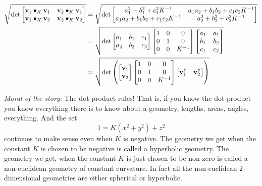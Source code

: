 \documentclass[newpage,hints,handout,12pt,noauthor,nooutcomes]{ximera}
\begin{document}
\begin{problem}
\begin{freeResponse}
\begin{align*}
\sqrt{\det
\begin{bmatrix}
\mathbf{v}_{1}\bullet_{K}\mathbf{v}_{1} & \mathbf{v}_{2}\bullet_{K}\mathbf{v}_{1}\\
\mathbf{v}_{1}\bullet_{K}\mathbf{v}_{2} & \mathbf{v}_{2}\bullet_{K}\mathbf{v}_{2}%
\end{bmatrix}}
&=\sqrt{\det
\begin{bmatrix}
a^2_1 + b^2_1 + c^2_1K^{-1} & a_1a_2 + b_1b_2 + c_1c_2K^{-1}\\
a_1a_2 + b_1b_2 + c_1c_2K^{-1} & a^2_2 + b^2_2 + c^2_2K^{-1}%
\end{bmatrix}} \\
&= \sqrt{\det
\begin{bmatrix}
a_{1} & b_{1} & c_{1}\\
a_{2} & b_{2} & c_{2}
\end{bmatrix}
\begin{bmatrix}
1 & 0 & 0\\
0 & 1 & 0\\
0 & 0 & K^{-1}
\end{bmatrix}
\begin{bmatrix}
a_{1} & a_{1}  \\
b_{1} & b_{2}  \\
c_{1} &  c_{2}
\end{bmatrix}} \\
&= \sqrt{\det\left( 
\begin{bmatrix}
\mathbf{v}_{1} \\
\mathbf{v}_{2}
\end{bmatrix}
\begin{bmatrix}
1 & 0 & 0\\
0 & 1 & 0\\
0 & 0 & K^{-1}%
\end{bmatrix}
\begin{bmatrix}
\mathbf{v}_{1}^\transpose & \mathbf{v}_{2}^\transpose%
\end{bmatrix}
\right) }
\end{align*}
\end{freeResponse}

\end{problem}

\textit{Moral of the story:} The dot-product rules! That is, if you
know the dot-product you know everything there is to know about a
geometry, lengths, areas, angles, everything. And the set
\[
1=K\left(x^{2}+y^{2}\right)+z^{2} 
\]
continues to make sense even when $K$ is negative.  The geometry we
get when the constant $K$ is chosen to be negative is called a
hyperbolic geometry. The geometry we get, when the constant $K$ is
just chosen to be non-zero is called a non-euclidean geometry of
constant curvature.  In fact all the non-euclidean $2$-dimensional
geometries are either spherical or hyperbolic.
\end{document}
